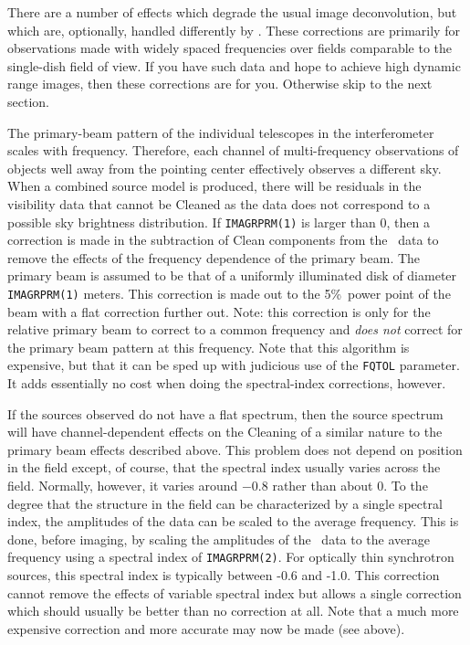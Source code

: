 
     There are a number of effects which degrade the usual image
deconvolution, but which are, optionally, handled differently by
{\tt {}}\@.  These corrections are primarily for
observations made with widely spaced frequencies over fields
comparable to the single-dish field of view.  If you have such data
and hope to achieve high dynamic range images, then these corrections
are for you.  Otherwise skip to the next section.


  The primary-beam pattern of the
individual telescopes in the interferometer scales with frequency.
Therefore, each channel of multi-frequency observations of objects
well away from the pointing center effectively observes a different
sky.  When a combined source model is produced, there will be
residuals in the visibility data that cannot be Cleaned as the data
does not correspond to a possible sky brightness distribution.   If
{\tt IMAGRPRM(1)} is larger than 0, then a correction is made in the
subtraction of Clean components from the \uv\ data to remove the
effects of the frequency dependence of the primary beam.  The primary
beam is assumed to be that of a uniformly illuminated disk of diameter
{\tt IMAGRPRM(1)} meters.  This correction is made out to the 5\%\ power
point of the beam with a flat correction further out.  Note: this
correction is only for the relative primary beam to correct to a
common frequency and {\it does not\/} correct for the primary beam
pattern at this frequency.  Note that this algorithm is expensive, but
that it can be sped up with judicious use of the {\tt FQTOL}
parameter.  It adds essentially no cost when doing the spectral-index
corrections, however.


   If the sources observed
do not have a flat spectrum, then the source spectrum will have
channel-dependent effects on the Cleaning of a similar nature to the
primary beam effects described above.  This problem does not depend on
position in the field except, of course, that the spectral index
usually varies across the field.  Normally, however, it varies around
$-0.8$ rather than about $0$.  To the degree that the structure in the
field can be characterized by a single spectral index, the amplitudes
of the data can be scaled to the average frequency.  This is done,
before imaging, by scaling the amplitudes of the \uv\ data to the
average frequency using a spectral index of {\tt IMAGRPRM(2)}.  For
optically thin synchrotron sources, this spectral index is typically
between -0.6 and -1.0.  This correction cannot remove the effects of
variable spectral index but allows a single correction which should
usually be better than no correction at all.  Note that a much more
expensive correction and more accurate may now be made (see above).

